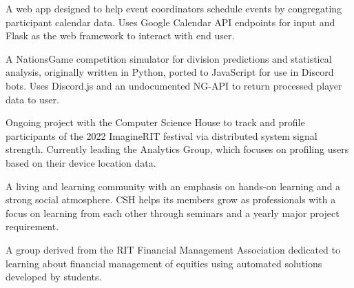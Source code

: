 \documentclass[10pt,a4paper,ragged2e,withhyper]{altacv}
\begin{document}
\begin{paracol}{2}


A web app designed to help event coordinators schedule events by congregating participant calendar data.  Uses Google Calendar API endpoints for input and Flask as the web framework to interact with end user.\par\vspace{.15cm}


\divider


A NationsGame competition simulator for division predictions and statistical analysis, originally written in Python, ported to JavaScript for use in Discord bots.  Uses Discord.js and an undocumented NG-API to return processed player data to user.\par\vspace{.15cm}


\divider


Ongoing project with the Computer Science House to track and profile participants of the 2022 ImagineRIT festival via distributed system signal strength.  Currently leading the Analytics Group, which focuses on profiling users based on their device location data. \par\vspace{.15cm}

\medskip


A living and learning community with an emphasis on hands-on learning and a strong social atmosphere. CSH helps its members grow as professionals with a focus on learning from each other through seminars and a yearly major project requirement.

\divider

A group derived from the RIT Financial Management Association dedicated to learning about financial management of equities using automated solutions developed by students.


\end{paracol}
\end{document}
